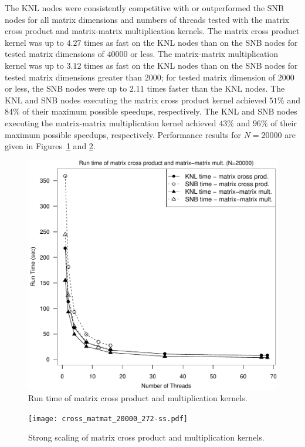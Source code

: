 The KNL nodes were consistently competitive with or outperformed the
  SNB nodes for all matrix dimensions and numbers of threads tested
  with the matrix cross product and matrix-matrix multiplication
  kernels.
The matrix cross product kernel was up to $4.27$ times as fast on the KNL
  nodes than on the SNB nodes for tested matrix dimensions of $40000$ or less.
The matrix-matrix multiplication kernel was up to $3.12$ times as fast on the
  KNL nodes than on the SNB nodes for tested matrix dimensions greater than
  $2000$; for tested matrix dimension of $2000$ or less, the SNB nodes were
  up to $2.11$ times faster than the KNL nodes.
The KNL and SNB nodes executing the matrix cross product kernel achieved $51\%$
  and $84\%$ of their maximum possible speedups, respectively.
The KNL and SNB nodes executing the matrix-matrix multiplication kernel achieved
  $43\%$ and $96\%$ of their maximum possible speedups, respectively.
Performance results for $N=20000$ are given in Figures~\ref{fig:crossMatmatTime}
  and \ref{fig:crossMatmatScale}.
\begin{figure}
\includegraphics[height=\columnwidth, width=\columnwidth]{cross_matmat_20000_68-rt.pdf}
\caption{Run time of matrix cross product and multiplication kernels.}
\label{fig:crossMatmatTime}
\end{figure}
\begin{figure}
\texttt{[image: cross\_matmat\_20000\_272-ss.pdf]}
\caption{Strong scaling of matrix cross product and multiplication kernels.}
\label{fig:crossMatmatScale}
\end{figure}

